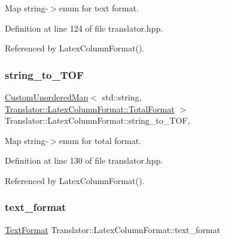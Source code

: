 Map string-\/$>$enum for text format. 



Definition at line 124 of file translator.\+hpp.



Referenced by Latex\+Column\+Format().

\mbox{\label{classTranslator_1_1LatexColumnFormat_acf911d2311f5897a7e18498359c5cdfb}} 
\subsubsection{\texorpdfstring{string\+\_\+to\+\_\+\+T\+OF}{string\_to\_TOF}}
{\footnotesize\ttfamily \hyperlink{custom__map_8hpp_ad1ed68f2ff093683ab1a33522b144adc}{Custom\+Unordered\+Map}$<$ std\+::string, \hyperlink{classTranslator_1_1LatexColumnFormat_a0754fb96fce28c9f04a8ef5353eede60}{Translator\+::\+Latex\+Column\+Format\+::\+Total\+Format} $>$ Translator\+::\+Latex\+Column\+Format\+::string\+\_\+to\+\_\+\+T\+OF\hspace{0.3cm}{\ttfamily [static]}, {\ttfamily [private]}}



Map string-\/$>$enum for total format. 



Definition at line 130 of file translator.\+hpp.



Referenced by Latex\+Column\+Format().

\mbox{\label{classTranslator_1_1LatexColumnFormat_ac0131296c9e8837fbcc265bc6ac8dc60}} 
\subsubsection{\texorpdfstring{text\+\_\+format}{text\_format}}
{\footnotesize\ttfamily \hyperlink{classTranslator_1_1LatexColumnFormat_a3e57341308ef433ca03cb41faa3e6c00}{Text\+Format} Translator\+::\+Latex\+Column\+Format\+::text\+\_\+format}



